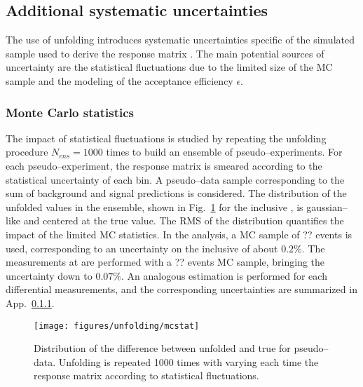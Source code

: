 \subsection{Additional systematic uncertainties}

The use of unfolding introduces systematic uncertainties
specific of the \ttbar{} simulated sample used to derive the response
matrix \TrasfMatrix{}.
The main potential sources of uncertainty are the statistical fluctuations due
to the limited size of the MC sample and the modeling of the
acceptance efficiency $\epsilon$.

\subsubsection{Monte Carlo statistics}

The impact of statistical fluctuations is studied by repeating the
unfolding procedure $N_{ens}=1000$ times to build an ensemble of
pseudo--experiments. For each pseudo--experiment, the response matrix
is smeared according to the statistical uncertainty of each bin. A
pseudo--data sample corresponding to the sum of background and signal
predictions is considered. The distribution of the unfolded \ac{}
values in the ensemble, shown in Fig.~\ref{fig:mcstat} for the
inclusive \ac{} \eighttev{}, is gaussian--like and centered at the
true \ac{} value. The RMS of the distribution quantifies the impact
of the limited MC statistics. In the \seventev{} analysis, a MC sample
of ?? \ttbar{} events is used, corresponding to an uncertainty on the
inclusive \ac{} of about $0.2\%$. The measurements at \eighttev{} are
performed with a ?? events MC sample, bringing the uncertainty down to
$0.07\%$. An analogous estimation is performed for each differential
measurements, and the corresponding uncertainties are summarized in
App.~\ref{}.

\begin{figure}[!htb]\centering
  \texttt{[image: figures/unfolding/mcstat]}
  \caption{Distribution of the difference between unfolded \ac{} and
    true \ac{} for pseudo--data. Unfolding is repeated 1000 times with
  varying each time the response matrix according to statistical
  fluctuations.}
  \label{fig:mcstat}
\end{figure}
